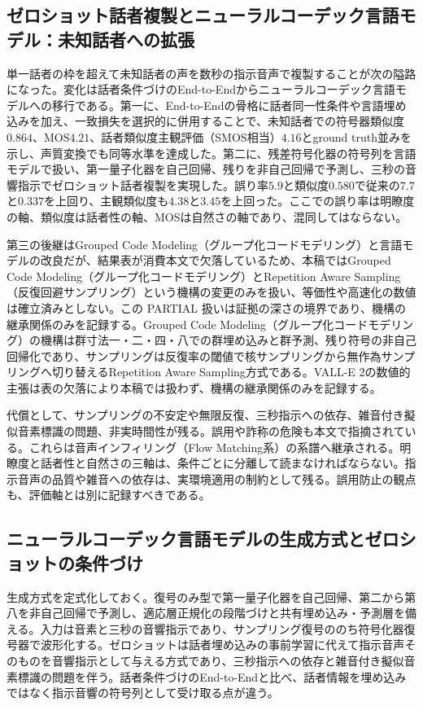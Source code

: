\documentclass[lualatex,a4paper,10pt]{jlreq}
\begin{document}
\subsection{ゼロショット話者複製とニューラルコーデック言語モデル：未知話者への拡張}
単一話者の枠を超えて未知話者の声を数秒の指示音声で複製することが次の隘路になった\autocite{btd057}。変化は話者条件づけのEnd-to-Endからニューラルコーデック言語モデルへの移行である\autocite{btd057,btd058}。第一に、End-to-Endの骨格に話者同一性条件や言語埋め込みを加え、一致損失を選択的に併用することで、未知話者での符号器類似度$0.864$、MOS$4.21$、話者類似度主観評価（SMOS相当）$4.16$とground truth並みを示し、声質変換でも同等水準を達成した\autocite{btd057}。第二に、残差符号化器の符号列を言語モデルで扱い、第一量子化器を自己回帰、残りを非自己回帰で予測し、三秒の音響指示でゼロショット話者複製を実現した\autocite{btd058}。誤り率$5.9$と類似度$0.580$で従来の$7.7$と$0.337$を上回り、主観類似度も$4.38$と$3.45$を上回った\autocite{btd058}。ここでの誤り率は明瞭度の軸、類似度は話者性の軸、MOSは自然さの軸であり、混同してはならない\autocite{btd057,btd058}。

第三の後継はGrouped Code Modeling（グループ化コードモデリング）と言語モデルの改良だが、結果表が消費本文で欠落しているため、本稿ではGrouped Code Modeling（グループ化コードモデリング）とRepetition Aware Sampling（反復回避サンプリング）という機構の変更のみを扱い、等価性や高速化の数値は確立済みとしない\autocite{btd059}。この PARTIAL 扱いは証拠の深さの境界であり、機構の継承関係のみを記録する\autocite{btd059}。Grouped Code Modeling（グループ化コードモデリング）の機構は群寸法一・二・四・八での群埋め込みと群予測、残り符号の非自己回帰化であり、サンプリングは反復率の閾値で核サンプリングから無作為サンプリングへ切り替えるRepetition Aware Sampling方式である\autocite{btd059}。VALL-E 2の数値的主張は表の欠落により本稿では扱わず、機構の継承関係のみを記録する\autocite{btd059}。

代償として、サンプリングの不安定や無限反復、三秒指示への依存、雑音付き擬似音素標識の問題、非実時間性が残る\autocite{btd058}。誤用や詐称の危険も本文で指摘されている\autocite{btd058,btd059}。これらは音声インフィリング（Flow Matching系）の系譜へ継承される\autocite{btd058,btd060}。明瞭度と話者性と自然さの三軸は、条件ごとに分離して読まなければならない\autocite{btd057,btd058}。指示音声の品質や雑音への依存は、実環境適用の制約として残る\autocite{btd057,btd058}。誤用防止の観点も、評価軸とは別に記録すべきである\autocite{btd058}。

\subsection{ニューラルコーデック言語モデルの生成方式とゼロショットの条件づけ}
生成方式を定式化しておく。復号のみ型で第一量子化器を自己回帰、第二から第八を非自己回帰で予測し、適応層正規化の段階づけと共有埋め込み・予測層を備える\autocite{btd058}。入力は音素と三秒の音響指示であり、サンプリング復号ののち符号化器復号器で波形化する\autocite{btd058}。ゼロショットは話者埋め込みの事前学習に代えて指示音声そのものを音響指示として与える方式であり、三秒指示への依存と雑音付き擬似音素標識の問題を伴う\autocite{btd058}。話者条件づけのEnd-to-Endと比べ、話者情報を埋め込みではなく指示音響の符号列として受け取る点が違う\autocite{btd057,btd058}。
\end{document}
